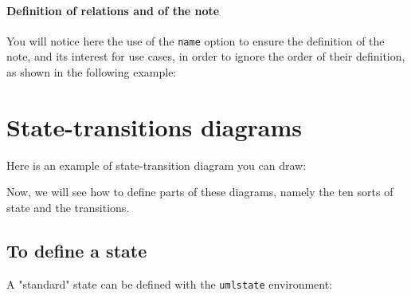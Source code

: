 \documentclass[a4paper,11pt]{report}
\begin{document}
\begin{center}
\end{center}

\subsubsection{Definition of relations and of the note}

You will notice here the use of the {\tt name} option to ensure the definition of the note, and its interest for use cases, in order to ignore the order of their definition, as shown in the following example:

\vspace{-0.4cm}
{\color{red!70!black}

}

\begin{center}
\end{center}

\chapter{State-transitions diagrams}\label{c.statetrans}

Here is an example of state-transition diagram you can draw:

\begin{center}
\end{center}

Now, we will see how to define parts of these diagrams, namely the ten sorts of state and the transitions.

\newpage

\section{To define a state}\label{s.state}

A "standard" state can be defined with the {\tt umlstate} environment:

\medskip

\begin{minipage}{0.51\textwidth}

\end{minipage}
\begin{minipage}{0.49\textwidth}
\begin{center}
\end{center}
\end{minipage}
\end{document}
